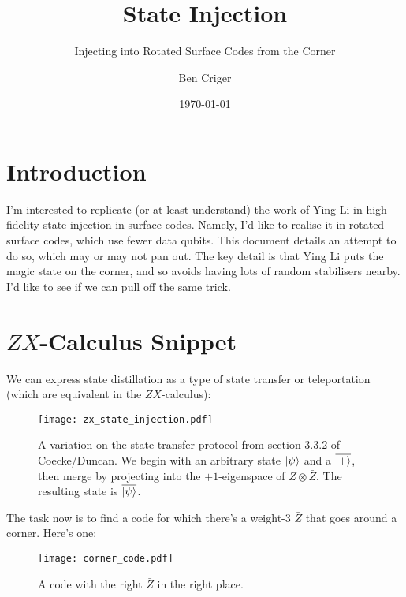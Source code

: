 \documentclass[a4paper, english]{scrartcl}
\title{State Injection}
\subtitle{Injecting into Rotated Surface Codes from the Corner}
\author{Ben Criger}
\date{\today}
\begin{document}
\maketitle
\section{Introduction}
I'm interested to replicate (or at least understand) the work of Ying Li in high-fidelity state injection in surface codes.
Namely, I'd like to realise it in rotated surface codes, which use fewer data qubits. 
This document details an attempt to do so, which may or may not pan out. 
The key detail is that Ying Li puts the magic state on the corner, and so avoids having lots of random stabilisers nearby. 
I'd like to see if we can pull off the same trick. 
\section{$ZX$-Calculus Snippet}
We can express state distillation as a type of state transfer or teleportation (which are equivalent in the $ZX$-calculus):
\begin{figure}[!ht]
\centering
\texttt{[image: zx\_state\_injection.pdf]}
\caption{A variation on the state transfer protocol from section 3.3.2 of Coecke/Duncan. 
We begin with an arbitrary state ${\left\vert{\psi}\right\rangle}$ and a $\overline{{\left\vert{+}\right\rangle}}$, then merge by projecting into the $+1$-eigenspace of $Z \otimes \bar{Z}$. 
The resulting state is $\overline{{\left\vert{\psi}\right\rangle}}$.}
\end{figure}

The task now is to find a code for which there's a weight-3 $\bar{Z}$ that goes around a corner. 
Here's one:
\begin{figure}[!ht]
\centering
\texttt{[image: corner\_code.pdf]}
\caption{A code with the right $\bar{Z}$ in the right place.}
\end{figure}
\end{document}
